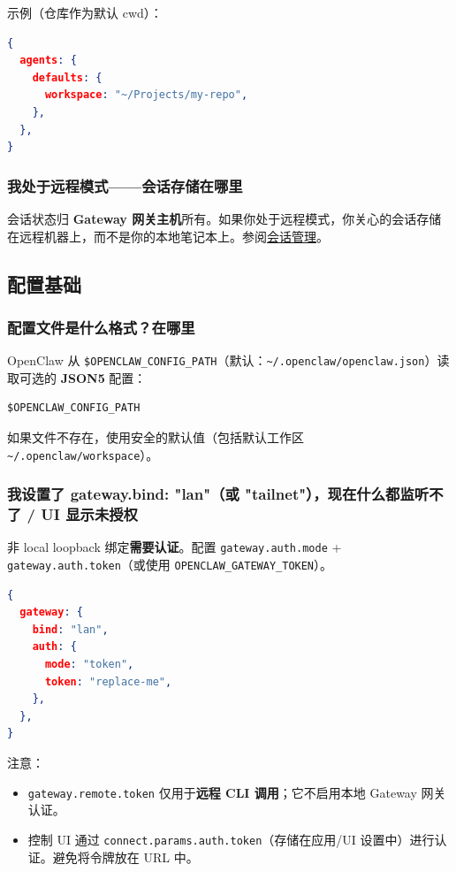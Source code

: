 示例（仓库作为默认 cwd）：

\begin{lstlisting}[language=json]
{
  agents: {
    defaults: {
      workspace: "~/Projects/my-repo",
    },
  },
}
\end{lstlisting}


\subsubsection{我处于远程模式——会话存储在哪里}


会话状态归 \textbf{Gateway 网关主机}所有。如果你处于远程模式，你关心的会话存储在远程机器上，而不是你的本地笔记本上。参阅\href{/concepts/session}{会话管理}。

\subsection{配置基础}


\subsubsection{配置文件是什么格式？在哪里}


OpenClaw 从 \texttt{\$OPENCLAW\_CONFIG\_PATH}（默认：\texttt{\textasciitilde{}/.openclaw/openclaw.json}）读取可选的 \textbf{JSON5} 配置：

\begin{lstlisting}
$OPENCLAW_CONFIG_PATH
\end{lstlisting}


如果文件不存在，使用安全的默认值（包括默认工作区 \texttt{\textasciitilde{}/.openclaw/workspace}）。

\subsubsection{我设置了 gateway.bind: "lan"（或 "tailnet"），现在什么都监听不了 / UI 显示未授权}


非 local loopback 绑定\textbf{需要认证}。配置 \texttt{gateway.auth.mode} + \texttt{gateway.auth.token}（或使用 \texttt{OPENCLAW\_GATEWAY\_TOKEN}）。

\begin{lstlisting}[language=json]
{
  gateway: {
    bind: "lan",
    auth: {
      mode: "token",
      token: "replace-me",
    },
  },
}
\end{lstlisting}


注意：

\begin{itemize}
  \item \texttt{gateway.remote.token} 仅用于\textbf{远程 CLI 调用}；它不启用本地 Gateway 网关认证。
  \item 控制 UI 通过 \texttt{connect.params.auth.token}（存储在应用/UI 设置中）进行认证。避免将令牌放在 URL 中。
\end{itemize}


